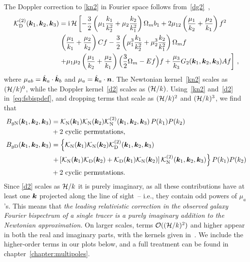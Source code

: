 The Doppler correction to \eqref{kn2} in Fourier space follows from~\eqref{dg2}~\citep{Jolicoeur:2017eyi},
\begin{align}
\mathcal{K}^{(2)}_{\mathrm{D}}(\bm {k}_1,\bm {k}_2,\bm {k}_3) &= \mathrm{i\,} \mathcal{H}
\left[ - \frac{3}{2} \left( \mu_{1} \frac{k_{1}}{k_2^2} + \mu_{2} \frac{k_{2}}{k_1^2} \right) \Omega_m b_1 + 2\mu_{12} \left( \frac{\mu_{1}}{k_2} + \frac{\mu_{2}}{k_1}\right) f^2  \right. \nonumber \\
& \left. \left( \frac{\mu_{1}}{k_1} + \frac{\mu_{2}}{k_2} \right){C} f - \frac{3}{2} \left( \mu_{1}^3 \frac{k_{1}}{k_2^2} + \mu_{2}^3 \frac{k_{2}}{k_1^2} \right)\Omega_m f \nonumber\right.  \\
&\left. + \mu_{1}\mu_{2}\left( \frac{\mu_{1}}{k_2} + \frac{\mu_{2}}{k_1} \right) {\Big( \frac{3}{2} \Omega_m - E f\Big) f} + \frac{\mu_{3}}{k_{3}} G_{2}(\bm{k}_{1}, \bm{k}_{2},\bm {k}_3){A} f\right]\,, \label{d2}
\end{align}
where $\mu_{ab}=\hat{\bm {k}}_a\cdot \hat{\bm {k}}_b$ and $\mu_a=\hat{\bm {k}}_a\cdot\bm n$. 
The Newtonian kernel~\eqref{kn2} scales as $(\mathcal{H}/k)^{0}$, while the Doppler kernel~\eqref{d2} scales as $(\mathcal{H}/k)$. 
Using~\eqref{kn2} and~\eqref{d2} in~\eqref{eq:fsbispdef}, and dropping terms that scale as $(\mathcal{H}/k)^{2}$ and $(\mathcal{H}/k)^{3}$,
we find that
\begin{align}
B_{g{\mathrm{N}}}(\bm {k}_1,\bm {k}_2,\bm {k}_3) &=  \mathcal{K}_{\mathrm{N}}(\bm {k}_1)\mathcal{K}_{\mathrm{N}}(\bm {k}_2)\mathcal{K}^{(2)}_{\mathrm{N}}(\bm {k}_1,\bm {k}_2,\bm {k}_3)\,P(k_{1})P(k_{2})  \nonumber \\
& +\text{2 cyclic permutations,} \\
B_{g{\mathrm{D}}}(\bm {k}_1,\bm {k}_2,\bm {k}_3) &= \left\{
\mathcal{K}_{\mathrm{N}}(\bm {k}_1)\mathcal{K}_{\mathrm{N}}(\bm {k}_2)\mathcal{K}^{(2)}_{\mathrm{D}}(\bm {k}_1,\bm {k}_2,\bm {k}_3) \right.
\nonumber\\ \label{bd}
& \left. +\left[ \mathcal{K}_{\mathrm{N}}(\bm {k}_1)\mathcal{K}_{\mathrm{D}}(\bm {k}_2)+\mathcal{K}_{\mathrm{D}}(\bm {k}_1)\mathcal{K}_{\mathrm{N}}(\bm {k}_2) \right]\mathcal{K}^{(2)}_{\mathrm{N}}(\bm {k}_1,\bm {k}_2,\bm {k}_3)
\right\}
P(k_{1})P(k_{2}) \nonumber \\
& +\text{2 cyclic permutations.}
\end{align}
Since \eqref{d2} scales as $\mathcal{H}/k$ it is purely imaginary, as all these contributions have at least one $\bm {k}$ projected along the line of sight~-- i.e.,  they contain odd powers of $\mu_a$'s. This means that {\em the leading relativistic correction in the observed galaxy Fourier bispectrum of a single tracer is a purely imaginary addition to the Newtonian approximation.} On larger scales, terms $\mathcal{O}((\mathcal{H}/k)^{2})$ and higher appear in both the real and imaginary parts, with the kernels given in~\citet{Umeh:2016nuh,Jolicoeur:2017nyt,Jolicoeur:2017eyi,Jolicoeur:2018blf}. We include the higher-order terms in our plots below, and a full treatment can be found in chapter~\ref{chapter:multipoles}.

